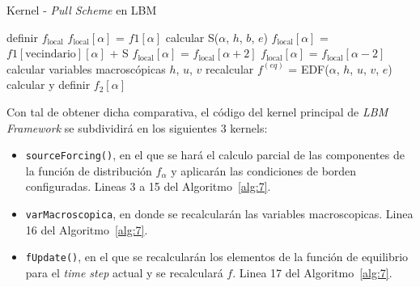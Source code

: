 \begin{algorithm}
\caption{Kernel - \textit{Pull Scheme} en LBM}
\label{alg:7}
\begin{algorithmic}[1]
    \State definir \(f_\text{local}\)
            \State \(f_\text{local}[\alpha]\) = \(f1[\alpha]\)
        \Else
            \State calcular S(\(\alpha\), \(h\), \(b\), \(e\))
            \State \(f_\text{local}[\alpha]\) = \(f1[\text{vecindario}][\alpha]\) + S
        \EndIf
    \EndFor
                \State \(f_\text{local}[\alpha]\) = $f_\text{local}[\alpha + 2]$
            \Else
                \State \(f_\text{local}[\alpha]\) = $f_\text{local}[\alpha - 2]$
            \EndIf
        \EndIf
    \EndFor
    \State calcular variables macroscópicas \(h\), \(u\), \(v\)
        \State recalcular $f^{(eq)}$ = EDF(\(\alpha\), \(h\), \(u\), \(v\), \(e\))
        \State calcular y definir \(f_2[\alpha]\)
    \EndFor
\EndIf
\EndProcedure
\end{algorithmic}
\end{algorithm}

Con tal de obtener dicha comparativa, el código del kernel principal de \textit{LBM Framework} se subdividirá en los siguientes 3 kernels:

\begin{itemize}
    \item \verb|sourceForcing()|, en el que se hará el calculo parcial de las componentes de la función de distribución \(f_\alpha\) y aplicarán las condiciones de borden configuradas. Lineas 3 a 15 del Algoritmo~\ref{alg:7}.
    \item \verb|varMacroscopica|, en donde se recalcularán las variables macroscopicas. Linea 16 del Algoritmo~\ref{alg:7}.
    \item \verb|fUpdate()|, en el que se recalcularán los elementos de la función de equilibrio para el \textit{time step} actual y se recalculará \(f\). Linea 17 del Algoritmo~\ref{alg:7}.
\end{itemize}
